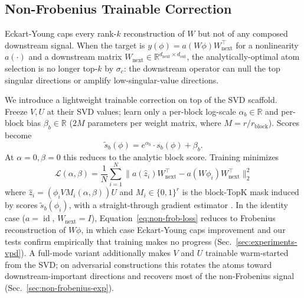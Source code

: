 \subsection{Non-Frobenius Trainable Correction}
\label{sec:non-frobenius}

Eckart-Young caps every rank-$k$ reconstruction of $W$ but not of any composed downstream signal. When the target is $y(\phi) = a(W \phi) W_\text{next}^\top$ for a nonlinearity $a(\cdot)$ and a downstream matrix $W_\text{next} \in \mathbb{R}^{d_\text{next} \times d_\text{out}}$, the analytically-optimal atom selection is no longer top-$k$ by $\sigma_c$: the downstream operator can null the top singular directions or amplify low-singular-value directions.

We introduce a lightweight trainable correction on top of the SVD scaffold. Freeze $V, U$ at their SVD values; learn only a per-block log-scale $\alpha_b \in \mathbb{R}$ and per-block bias $\beta_b \in \mathbb{R}$ ($2M$ parameters per weight matrix, where $M = r / r_\text{block}$). Scores become
\begin{equation}
\tilde{s}_b(\phi) = e^{\alpha_b} \cdot s_b(\phi) + \beta_b.
\end{equation}
At $\alpha = 0, \beta = 0$ this reduces to the analytic block score. Training minimizes
\begin{equation}
\mathcal{L}(\alpha, \beta) = \frac{1}{N} \sum_{i=1}^{N} \| a(\hat{z}_i) W_\text{next}^\top - a(W \phi_i) W_\text{next}^\top \|_2^2
\label{eq:non-frob-loss}
\end{equation}
where $\hat{z}_i = (\phi_i V M_i(\alpha, \beta)) U$ and $M_i \in \{0, 1\}^r$ is the block-TopK mask induced by scores $\tilde{s}_b(\phi_i)$, with a straight-through gradient estimator \citep{bengio2013ste}. In the identity case ($a = \operatorname{id}$, $W_\text{next} = I$), Equation~\ref{eq:non-frob-loss} reduces to Frobenius reconstruction of $W \phi$, in which case Eckart-Young caps improvement and our tests confirm empirically that training makes no progress (Sec.\ \ref{sec:experiments-vpd}). A full-mode variant additionally makes $V$ and $U$ trainable warm-started from the SVD; on adversarial constructions this rotates the atoms toward downstream-important directions and recovers most of the non-Frobenius signal (Sec.\ \ref{sec:non-frobenius-exp}).
